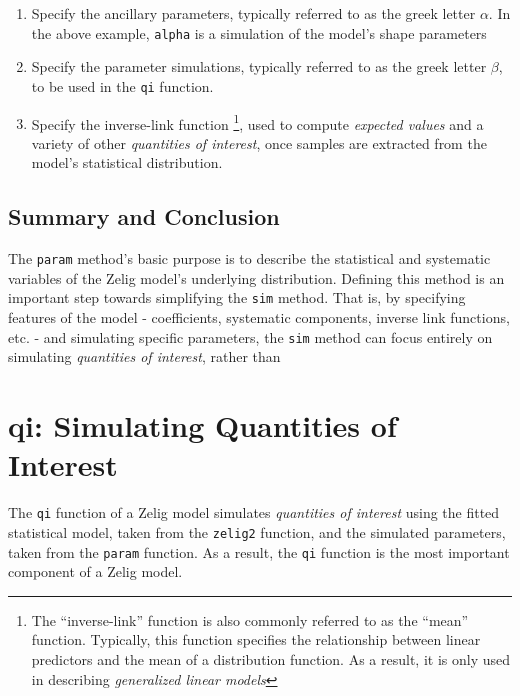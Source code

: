 \documentclass{article}
\newcommand{\code}[1]{{\tt #1}}
\begin{document}
\begin{enumerate}

	\item Specify the ancillary parameters, typically referred to as the greek letter $\alpha$.
		In the above example, \code{alpha} is a simulation of the model's shape parameters
	
	\item Specify the parameter simulations, typically referred to as the greek letter $\beta$, to be used in the \code{qi} function. 
	
	\item Specify the inverse-link function
		\footnote{The ``inverse-link'' function is also commonly referred to as the ``mean'' function. Typically, this function specifies the relationship between linear predictors and the mean of a distribution function. As a result, it is only used in describing \emph{generalized linear models} },
		used to compute \emph{expected values} and a variety of other \emph{quantities of interest}, once samples are extracted from the model's statistical distribution.

\end{enumerate}


\subsection{Summary and Conclusion}

The \code{param} method's basic purpose is to describe the statistical and systematic variables of the Zelig model's underlying distribution. Defining this method is an important step towards simplifying the \code{sim} method. That is, by specifying features of the model - coefficients, systematic components, inverse link functions, etc. - and simulating specific parameters, the \code{sim} method can focus entirely on simulating \emph{quantities of interest}, rather than
	



\section{qi: Simulating Quantities of Interest}\label{section:qi}

The \code{qi} function of a Zelig model simulates \emph{quantities of interest}
using the fitted statistical model, taken from the \code{zelig2} function,
and the simulated parameters, taken from the \code{param} function. As a result,
the \code{qi} function is the most important component of a Zelig model.
\end{document}
